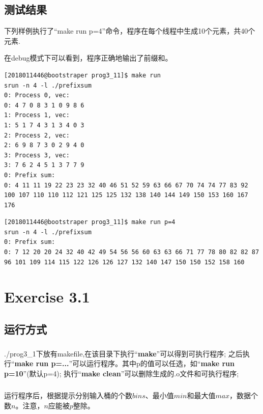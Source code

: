 \documentclass[UTF8, onecolumn, a4paper]{article}
\begin{document}
\subsection{测试结果}
下列样例执行了“make run p=4”命令，程序在每个线程中生成10个元素，共40个元素.
\par 在debug模式下可以看到，程序正确地输出了前缀和。
\begin{lstlisting}[language={}, title={debug模式}]
[2018011446@bootstraper prog3_11]$ make run
srun -n 4 -l ./prefixsum
0: Process 0, vec:
0: 4 7 0 8 3 1 0 9 8 6 
1: Process 1, vec:
1: 5 1 7 4 3 1 3 4 0 3 
2: Process 2, vec:
2: 6 9 8 7 3 0 2 9 4 0 
3: Process 3, vec:
3: 7 6 2 4 5 1 3 7 7 9 
0: Prefix sum:
0: 4 11 11 19 22 23 23 32 40 46 51 52 59 63 66 67 70 74 74 77 83 92 100 107 110 110 112 121 125 125 132 138 140 144 149 150 153 160 167 176  
\end{lstlisting}
\begin{lstlisting}[language={}, title={release模式}]
[2018011446@bootstraper prog3_11]$ make run p=4
srun -n 4 -l ./prefixsum
0: Prefix sum:
0: 7 12 20 20 24 32 40 42 49 54 56 56 60 63 63 66 71 77 78 80 82 82 87 96 101 109 114 115 122 126 126 127 132 140 147 150 150 152 158 160 
\end{lstlisting}



\section{Exercise 3.1}
\subsection{运行方式}
\subparagraph*{}
./prog3\_1下放有makefile,在该目录下执行“\textbf{make}”可以得到可执行程序; 之后执行“\textbf{make run p=...}”可以运行程序。其中p的值可以任选，如“\textbf{make run p=10}”(默认p=4); 执行“\textbf{make clean}”可以删除生成的.o文件和可执行程序;
\subparagraph*{}
运行程序后，根据提示分别输入桶的个数$bins$、最小值$min$和最大值$max$，数据个数$n$。注意，$n$应能被$p$整除。
\end{document}
